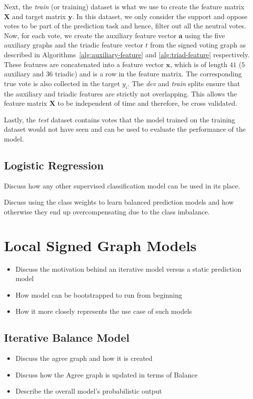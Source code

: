 Next, the \textit{train} (or training) dataset is what we use to create the feature matrix $\mathbf{X}$ and target matrix $\mathbf{y}$.
In this dataset, we only consider the support and oppose votes to be part of the prediction task and hence, filter out all the neutral votes.
Now, for each vote, we create the auxiliary feature vector $\textbf{a}$ using the five auxiliary graphs and the triadic feature vector $t$ from the signed voting graph as described in Algorithms~\ref{alg:auxiliary-feature} and \ref{alg:triad-feature} respectively.
These features are concatenated into a feature vector $\textbf{x}$, which is of length $41$ ($5$ auxiliary and $36$ triadic) and is a row in the feature matrix.
The corresponding true vote is also collected in the target $y_i$.
The \textit{dev} and \textit{train} splits ensure that the auxiliary and triadic features are strictly not overlapping.
This allows the feature matrix $\textbf{X}$ to be independent of time and therefore, be cross validated.

Lastly, the \textit{test} dataset contains votes that the model trained on the training dataset would not have seen and can be used to evaluate the performance of the model.

\subsection{Logistic Regression}
    Discuss how any other supervised classification model can be used in its place.

    Discuss using the class weights to learn balanced prediction models and how otherwise they end up overcompensating due to the class imbalance.


\section{Local Signed Graph Models}
\label{sec:local-signed-network-implementation}
    \begin{itemize}
        \item Discuss the motivation behind an iterative model versus a static prediction model
        \item How model can be bootstrapped to run from beginning
        \item How it more closely represents the use case of such models
    \end{itemize}
    \subsection{Iterative Balance Model}
        \begin{itemize}
            \item Discuss the agree graph and how it is created
            \item Discuss how the Agree graph is updated in terms of Balance
            \item Describe the overall model's probabilistic output
        \end{itemize}
